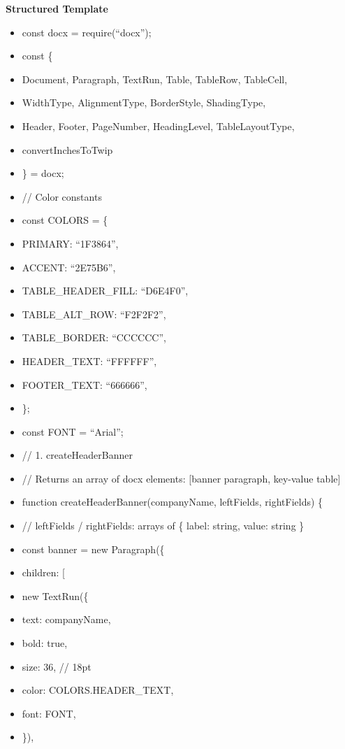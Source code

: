 \documentclass[11pt]{article}
\begin{document}
\textbf{Structured Template}
\begin{itemize}[leftmargin=*,itemsep=2pt,topsep=2pt]
\item {} const docx = require(``docx'');
\item {} const \{
\item {} Document, Paragraph, TextRun, Table, TableRow, TableCell,
\item {} WidthType, AlignmentType, BorderStyle, ShadingType,
\item {} Header, Footer, PageNumber, HeadingLevel, TableLayoutType,
\item {} convertInchesToTwip
\item {} \} = docx;
\item {} // Color constants
\item {} const COLORS = \{
\item {} PRIMARY: ``1F3864'',
\item {} ACCENT: ``2E75B6'',
\item {} TABLE\_\allowbreak{}HEADER\_\allowbreak{}FILL: ``D6E4F0'',
\item {} TABLE\_\allowbreak{}ALT\_\allowbreak{}ROW: ``F2F2F2'',
\item {} TABLE\_\allowbreak{}BORDER: ``CCCCCC'',
\item {} HEADER\_\allowbreak{}TEXT: ``FFFFFF'',
\item {} FOOTER\_\allowbreak{}TEXT: ``666666'',
\item {} \};
\item {} const FONT = ``Arial'';
\item {} // 1. createHeaderBanner
\item {} // Returns an array of docx elements: [banner paragraph, key-value table]
\item {} function createHeaderBanner(companyName, leftFields, rightFields) \{
\item {} // leftFields / rightFields: arrays of \{ label: string, value: string \}
\item {} const banner = new Paragraph(\{
\item {} children: [
\item {} new TextRun(\{
\item {} text: companyName,
\item {} bold: true,
\item {} size: 36, // 18pt
\item {} color: COLORS.HEADER\_\allowbreak{}TEXT,
\item {} font: FONT,
\item {} \}),

\end{itemize}
\end{document}
